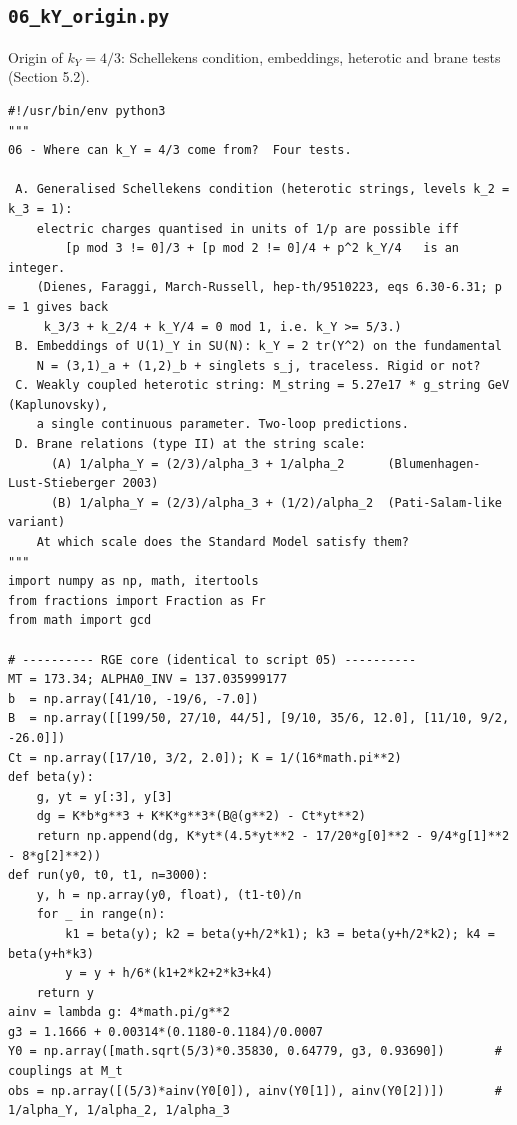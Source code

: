 \documentclass[11pt,a4paper]{article}
\begin{document}
\subsection{\texttt{06\_kY\_origin.py}}
Origin of $k_Y=4/3$: Schellekens condition, embeddings, heterotic and brane tests (Section 5.2).
\begin{lstlisting}
#!/usr/bin/env python3
"""
06 - Where can k_Y = 4/3 come from?  Four tests.

 A. Generalised Schellekens condition (heterotic strings, levels k_2 = k_3 = 1):
    electric charges quantised in units of 1/p are possible iff
        [p mod 3 != 0]/3 + [p mod 2 != 0]/4 + p^2 k_Y/4   is an integer.
    (Dienes, Faraggi, March-Russell, hep-th/9510223, eqs 6.30-6.31; p = 1 gives back
     k_3/3 + k_2/4 + k_Y/4 = 0 mod 1, i.e. k_Y >= 5/3.)
 B. Embeddings of U(1)_Y in SU(N): k_Y = 2 tr(Y^2) on the fundamental
    N = (3,1)_a + (1,2)_b + singlets s_j, traceless. Rigid or not?
 C. Weakly coupled heterotic string: M_string = 5.27e17 * g_string GeV (Kaplunovsky),
    a single continuous parameter. Two-loop predictions.
 D. Brane relations (type II) at the string scale:
      (A) 1/alpha_Y = (2/3)/alpha_3 + 1/alpha_2      (Blumenhagen-Lust-Stieberger 2003)
      (B) 1/alpha_Y = (2/3)/alpha_3 + (1/2)/alpha_2  (Pati-Salam-like variant)
    At which scale does the Standard Model satisfy them?
"""
import numpy as np, math, itertools
from fractions import Fraction as Fr
from math import gcd

# ---------- RGE core (identical to script 05) ----------
MT = 173.34; ALPHA0_INV = 137.035999177
b  = np.array([41/10, -19/6, -7.0])
B  = np.array([[199/50, 27/10, 44/5], [9/10, 35/6, 12.0], [11/10, 9/2, -26.0]])
Ct = np.array([17/10, 3/2, 2.0]); K = 1/(16*math.pi**2)
def beta(y):
    g, yt = y[:3], y[3]
    dg = K*b*g**3 + K*K*g**3*(B@(g**2) - Ct*yt**2)
    return np.append(dg, K*yt*(4.5*yt**2 - 17/20*g[0]**2 - 9/4*g[1]**2 - 8*g[2]**2))
def run(y0, t0, t1, n=3000):
    y, h = np.array(y0, float), (t1-t0)/n
    for _ in range(n):
        k1 = beta(y); k2 = beta(y+h/2*k1); k3 = beta(y+h/2*k2); k4 = beta(y+h*k3)
        y = y + h/6*(k1+2*k2+2*k3+k4)
    return y
ainv = lambda g: 4*math.pi/g**2
g3 = 1.1666 + 0.00314*(0.1180-0.1184)/0.0007
Y0 = np.array([math.sqrt(5/3)*0.35830, 0.64779, g3, 0.93690])       # couplings at M_t
obs = np.array([(5/3)*ainv(Y0[0]), ainv(Y0[1]), ainv(Y0[2])])       # 1/alpha_Y, 1/alpha_2, 1/alpha_3


\end{lstlisting}
\end{document}
